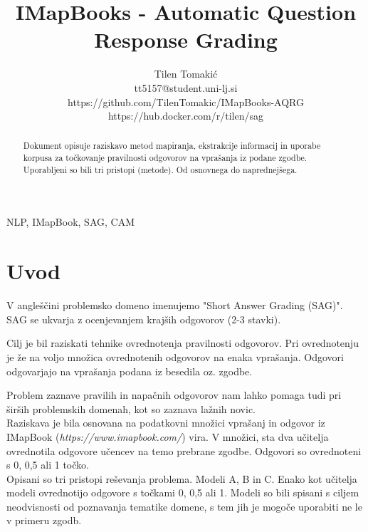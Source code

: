 \documentclass[journal]{IEEEtran}
\begin{document}
\title{IMapBooks - Automatic Question Response Grading}
\author{Tilen Tomakić\\tt5157@student.uni-lj.si\\https://github.com/TilenTomakic/IMapBooks-AQRG\\https://hub.docker.com/r/tilen/sag}%
\maketitle

\begin{abstract}	
  Dokument opisuje raziskavo metod mapiranja, ekstrakcije informacij in uporabe korpusa za točkovanje pravilnosti odgovorov na vprašanja iz podane zgodbe. Uporabljeni so bili tri pristopi (metode). Od osnovnega do naprednejšega.
\end{abstract}

\begin{IEEEkeywords}
NLP, IMapBook, SAG, CAM
\end{IEEEkeywords}

\IEEEpeerreviewmaketitle

\section{Uvod}
V angleščini problemsko domeno imenujemo "Short Answer Grading (SAG)". SAG se ukvarja z ocenjevanjem krajših odgovorov (2-3 stavki).

Cilj je bil raziskati tehnike ovrednotenja pravilnosti odgovorov. Pri ovrednotenju je že na voljo množica ovrednotenih odgovorov na enaka vprašanja. Odgovori odgovarjajo na vprašanja podana iz besedila oz. zgodbe.

Problem zaznave pravilih in napačnih odgovorov nam lahko pomaga tudi pri širših problemskih domenah, kot so zaznava lažnih novic.\\

Raziskava je bila osnovana na podatkovni množici vprašanj in odgovor iz IMapBook (\textit{https://www.imapbook.com/}) vira. V množici, sta dva učitelja ovrednotila odgovore učencev na temo prebrane zgodbe. Odgovori so ovrednoteni s 0, 0,5 ali 1 točko.\\

Opisani so tri pristopi reševanja problema. Modeli A, B in C. Enako kot učitelja modeli ovrednotijo odgovore s točkami 0, 0,5 ali 1. Modeli so bili spisani s ciljem neodvisnosti od poznavanja tematike domene, s tem jih je mogoče uporabiti ne le v primeru zgodb.
\end{document}
